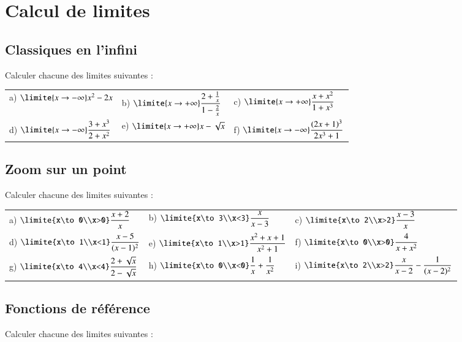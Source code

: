 \documentclass[oneside,12pt]{article}          %
\begin{document}
\section{Calcul de limites}

\subsection{Classiques en l'infini}
Calculer chacune des limites suivantes :

\renewcommand{\arraystretch}{2}
\begin{tabular}{p{} p{} p{}}
	a) $\limite{x\to-\infty} x^2-2x$  &
	b) $\limite{x\to+\infty}\dfrac{2+\frac{1}{x}}{1-\frac{2}{x}}$&
	c) $\limite{x\to+\infty}\dfrac{x+x^2}{1+x^3}$ \\
	d) $\limite{x\to-\infty}\dfrac{3+x^3}{2+x^2}$ &
	e) $\limite{x\to+\infty} x-\sqrt{x}$ &
	f) $\limite{x\to-\infty}\dfrac{(2x+1)^3}{2x^3+1}$
\end{tabular}



\subsection{Zoom sur un point}
Calculer chacune des limites suivantes :

\renewcommand{\arraystretch}{2}
\begin{tabular}{p{} p{} p{}}
	a) $\limite{x\to0\\x>0} \dfrac{x+2}{x}$  &
	b) $\limite{x\to3\\x<3} \dfrac{x}{x-3}$&
	c) $\limite{x\to2\\x>2} \dfrac{x-3}{x}$ \\
	d) $\limite{x\to1\\x<1} \dfrac{x-5}{(x-1)^2}$ &
	e) $\limite{x\to1\\x>1} \dfrac{x^2+x+1}{x^2+1}$ &
	f) $\limite{x\to0\\x>0} \dfrac{4}{x+x^2}$ \\
	g) $\limite{x\to4\\x<4} \dfrac{2+\sqrt{x}}{2-\sqrt{x}}$ &
	h) $\limite{x\to0\\x<0} \dfrac{1}{x}+\dfrac{1}{x^2}$ &
	i) $\limite{x\to2\\x>2} \dfrac{x}{x-2}-\dfrac{1}{(x-2)^2}$
\end{tabular}



\subsection{Fonctions de référence}
Calculer chacune des limites suivantes :
\end{document}
